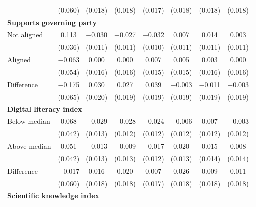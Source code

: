 \begin{tabular}[t]{lccccccc}
 & (\num{0.060}) & (\num{0.018}) & (\num{0.018}) & (\num{0.017}) & (\num{0.018}) & (\num{0.018}) & (\num{0.018})\\\multicolumn{4}{l}{\textbf{Supports governing party}} \rule{0pt}{1.2\normalbaselineskip}\\
\hspace{1em} Not aligned & \num{0.113} & \num{-0.030} & \num{-0.027} & \num{-0.032} & \num{0.007} & \num{0.014} & \num{0.003}\\
 & (\num{0.036}) & (\num{0.011}) & (\num{0.011}) & (\num{0.010}) & (\num{0.011}) & (\num{0.011}) & (\num{0.011})\\
\hspace{1em} Aligned & \num{-0.063} & \num{0.000} & \num{0.000} & \num{0.007} & \num{0.005} & \num{0.003} & \num{0.000}\\
 & (\num{0.054}) & (\num{0.016}) & (\num{0.016}) & (\num{0.015}) & (\num{0.015}) & (\num{0.016}) & (\num{0.016})\\\cmidrule(lr){2-8}
\hspace{1em} Difference & \num{-0.175} & \num{0.030} & \num{0.027} & \num{0.039} & \num{-0.003} & \num{-0.011} & \num{-0.003}\\
 & (\num{0.065}) & (\num{0.020}) & (\num{0.019}) & (\num{0.019}) & (\num{0.019}) & (\num{0.019}) & (\num{0.019})\\\multicolumn{4}{l}{\textbf{Digital literacy index}} \rule{0pt}{1.2\normalbaselineskip}\\
\hspace{1em} Below median & \num{0.068} & \num{-0.029} & \num{-0.028} & \num{-0.024} & \num{-0.006} & \num{0.007} & \num{-0.003}\\
 & (\num{0.042}) & (\num{0.013}) & (\num{0.012}) & (\num{0.012}) & (\num{0.012}) & (\num{0.012}) & (\num{0.012})\\
\hspace{1em} Above median & \num{0.051} & \num{-0.013} & \num{-0.009} & \num{-0.017} & \num{0.020} & \num{0.015} & \num{0.008}\\
 & (\num{0.042}) & (\num{0.013}) & (\num{0.013}) & (\num{0.012}) & (\num{0.013}) & (\num{0.014}) & (\num{0.014})\\\cmidrule(lr){2-8}
\hspace{1em}  Difference & \num{-0.017} & \num{0.016} & \num{0.020} & \num{0.007} & \num{0.026} & \num{0.009} & \num{0.011}\\
 & (\num{0.060}) & (\num{0.018}) & (\num{0.018}) & (\num{0.017}) & (\num{0.018}) & (\num{0.018}) & (\num{0.018})\\\multicolumn{4}{l}{\textbf{Scientific knowledge index}} \rule{0pt}{1.2\normalbaselineskip}\\

\end{tabular}
